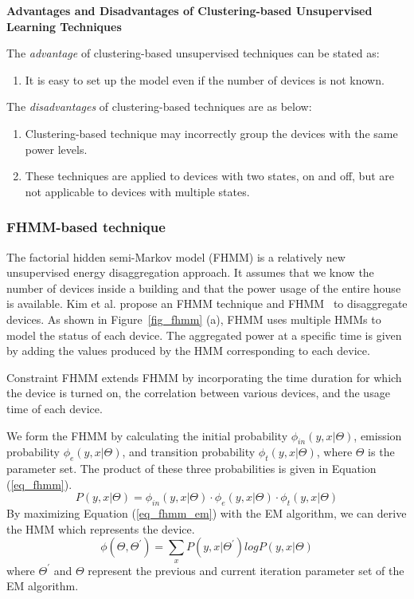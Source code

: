 \textbf{Advantages and Disadvantages of Clustering-based Unsupervised Learning Techniques}

The \textit{advantage} of clustering-based unsupervised techniques can be stated as:
\begin{enumerate}
\item It is easy to set up the model even if the number of devices is 
not known.
\end{enumerate}

The \textit{disadvantages} of clustering-based techniques are as below:
\begin{enumerate}
\item Clustering-based technique may incorrectly group the devices with the same power levels. 
\item These techniques are applied to devices with two states, on and off, but are not applicable 
to devices with multiple states.  
\end{enumerate}

\subsubsection{FHMM-based technique}
The factorial hidden semi-Markov model (FHMM) is a relatively new unsupervised energy disaggregation approach. 
It assumes that we know the number of devices inside a building 
and that the power usage of the entire house is available. 
Kim et al. propose an FHMM technique and FHMM~\cite{kim2011unsupervised} to disaggregate devices. 
As shown in Figure~\ref{fig_fhmm} (a),
FHMM uses multiple HMMs to model
the status of each device. 
The aggregated power at a specific time is given by adding the values produced by the HMM corresponding to each device.

Constraint FHMM
extends FHMM by incorporating the time duration for which the device is turned on, the
correlation between various devices, and the usage time of each device. 

We form the FHMM by calculating the initial probability $\phi_{in}(y,x|\Theta)$,
emission probability $\phi_{e}(y,x|\Theta)$, and
transition probability $\phi_{t}(y,x|\Theta)$,
where $\Theta$ is the parameter set.
The product of these three probabilities is given in Equation (\ref{eq_fhmm}).
\begin{equation}
\label{eq_fhmm}
P(y,x|\Theta)= \phi_{in}(y,x|\Theta) \cdot \phi_{e}(y,x|\Theta) \cdot \phi_{t}(y,x|\Theta)
\end{equation}
By maximizing Equation (\ref{eq_fhmm_em}) with the EM algorithm,
we can derive the HMM which represents the device. 
\begin{equation}
\label{eq_fhmm_em}
\phi(\Theta,\Theta^\prime)= \sum_x P(y,x|\Theta^\prime) log P(y,x|\Theta)
\end{equation}
where $\Theta^\prime $ and $\Theta$ represent the previous and current
iteration parameter set of the EM algorithm.

